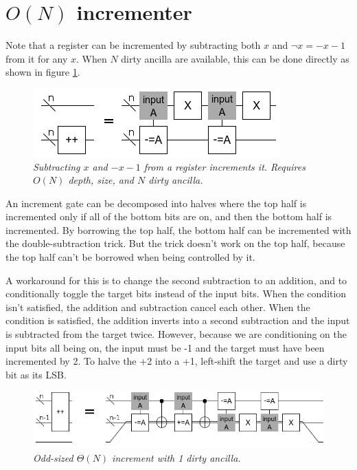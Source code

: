 \documentclass[twocolumn]{article}
\begin{document}
\section{$O(N)$ incrementer}

Note that a register can be incremented by subtracting both $x$ and $\neg x = -x-1$ from it for any $x$.
When $N$ dirty ancilla are available, this can be done directly as shown in figure \ref{fig:double-sub-increment}.

\begin{figure}
  \centering
  \includegraphics[totalheight=2cm]{double-sub-increment.png}
  \caption{\em Subtracting $x$ and $-x-1$ from a register increments it. Requires $O(N)$ depth, size, and $N$ dirty ancilla.}
  \label{fig:double-sub-increment}
\end{figure}

An increment gate can be decomposed into halves where the top half is incremented only if all of the bottom bits are on, and then the bottom half is incremented.
By borrowing the top half, the bottom half can be incremented with the double-subtraction trick.
But the trick doesn't work on the top half, because the top half can't be borrowed when being controlled by it.

A workaround for this is to change the second subtraction to an addition, and to conditionally toggle the target bits instead of the input bits.
When the condition isn't satisfied, the addition and subtraction cancel each other.
When the condition is satisfied, the addition inverts into a second subtraction and the input is subtracted from the target twice.
However, because we are conditioning on the input bits all being on, the input must be -1 and the target must have been incremented by 2.
To halve the +2 into a +1, left-shift the target and use a dirty bit as its LSB.

\begin{figure}
  \centering
  \includegraphics[totalheight=1.5cm]{compact-increment.png}
  \caption{\em Odd-sized $\Theta(N)$ increment with 1 dirty ancilla.}
  \label{fig:compact-increment}
\end{figure}
\end{document}
